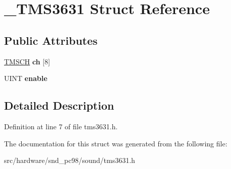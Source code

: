 \hypertarget{struct__TMS3631}{\section{\-\_\-\-T\-M\-S3631 Struct Reference}
\label{struct__TMS3631}
}
\subsection*{Public Attributes}
\begin{DoxyCompactItemize}
\item 
\hypertarget{struct__TMS3631_a3595e2e2becc3e958048dfeab737fc24}{\hyperlink{structTMSCH}{T\-M\-S\-C\-H} {\bfseries ch} \mbox{[}8\mbox{]}}\label{struct__TMS3631_a3595e2e2becc3e958048dfeab737fc24}

\item 
\hypertarget{struct__TMS3631_a778a39005f0dde45e75745e045883616}{U\-I\-N\-T {\bfseries enable}}\label{struct__TMS3631_a778a39005f0dde45e75745e045883616}

\end{DoxyCompactItemize}


\subsection{Detailed Description}


Definition at line 7 of file tms3631.\-h.



The documentation for this struct was generated from the following file\-:\begin{DoxyCompactItemize}
\item 
src/hardware/snd\-\_\-pc98/sound/tms3631.\-h\end{DoxyCompactItemize}
